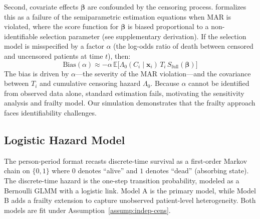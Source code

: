 \documentclass[twoside,11pt]{article}
\newcommand{\bx}{\mathbf{x}}
\begin{document}
Second, covariate effects $\boldsymbol{\beta}$ are confounded by the censoring process. \citet{scharfstein1999} formalizes this as a failure of the semiparametric estimation equations when MAR is violated, where the score function for $\boldsymbol{\beta}$ is biased proportional to a non-identifiable selection parameter (see supplementary derivation). If the selection model is misspecified by a factor $\alpha$ (the log-odds ratio of death between censored and uncensored patients at time $t$), then:
\begin{equation}  \label{eq:confounding-bias}
    \text{Bias}(\alpha) \approx -\alpha \, \mathbb{E} \Big[ \Lambda_0(C_i \mid \bx_i) \, T_i \, S_\text{full}(\boldsymbol{\beta}) \Big]
\end{equation}
The bias is driven by $\alpha$---the severity of the MAR violation---and the covariance between $T_i$ and cumulative censoring hazard $\Lambda_0$. Because $\alpha$ cannot be identified from observed data alone, standard estimation fails, motivating the sensitivity analysis and frailty model. Our simulation demonstrates that the frailty approach faces identifiability challenges.

\subsection{Logistic Hazard Model} \label{sc:model}
 The person-period format recasts discrete-time survival as a first-order Markov chain on $\{0,1\}$ where $0$ denotes ``alive'' and $1$ denotes ``dead'' (absorbing state). The discrete-time hazard is the one-step transition probability, modeled as a Bernoulli GLMM with a logistic link. Model A is the primary model, while Model B adds a frailty extension to capture unobserved patient-level heterogeneity. Both models are fit under Assumption~\ref{assump:indep-cens}.
 
\end{document}
